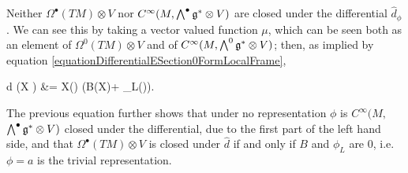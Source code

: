 \begin{remark}
Neither $\Omega^\bullet(TM) \otimes V$ nor $C^\infty(M, \bigwedge^\bullet \mathfrak{g}^* \otimes V)$ are closed under the differential $\hat d_\phi$. We can see this by taking a vector valued function $\mu$, which can be seen both as an element of $\Omega^0(TM)\otimes V$ and of $C^\infty(M, \bigwedge^0 \mathfrak{g}^* \otimes V)$; then, as implied by equation \ref{equationDifferentialESection0FormLocalFrame},
\begin{eqnsplit}\label{equationDifferentialOfSection0FormInTrivialization}
    \hat d \mu(X \oplus \eta) &= X(\mu) \oplus (B(X)\mu + \phi_L(\eta)\mu).
\end{eqnsplit}
The previous equation further shows that under no representation $\phi$ is $C^\infty(M,$ $\bigwedge^\bullet \mathfrak{g}^* \otimes V)$ closed under the differential, due to the first part of the left hand side, and that $\Omega^\bullet(TM)\otimes V$ is closed under $\hat d$ if and only if $B$ and $\phi_L$ are $0$, i.e. $\phi = a$ is the trivial representation. 
\end{remark}



